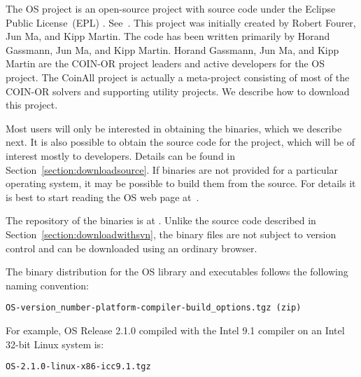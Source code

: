 \label{section:obtainingbinaries}

\ifdevelop
The OS project is an open-source project  with source code under the Eclipse Public License~(EPL)%
.
See~{\tt\UrlEpl}.  This project was initially created by Robert Fourer, Jun Ma, and Kipp Martin.
The code has been written primarily by  Horand Gassmann,   Jun Ma,  and Kipp Martin.    
Horand Gassmann,  Jun Ma,  and Kipp Martin are the COIN-OR project leaders and active developers for the OS project.
\else
The CoinAll project is actually a meta-project consisting of most of the COIN-OR solvers and supporting utility projects.  We describe how to download this project. 
\fi

Most users will only be interested in obtaining the binaries, which we describe  next.
It is also possible to obtain the source code for the project, which will be of interest mostly to developers. 
\ifdevelop
Details can be found in  Section~\ref{section:downloadsource}.
\else
If binaries are not provided for a particular operating system, it may be possible to build them from the source.
For details it is best to start reading the OS web page at~{\tt\UrlOsWiki}.
\fi



The repository of the binaries is at {\tt\UrlOsBinaries}.
%
\ifdevelop
 Unlike the source code described in Section~\ref{section:downloadwithsvn}, the binary files 
are not subject to version control and can be downloaded using an ordinary browser. 
\fi

The binary distribution for the OS library and executables follows the following naming convention:


\begin{verbatim}
OS-version_number-platform-compiler-build_options.tgz (zip)
\end{verbatim}
For example, OS  Release 2.1.0 compiled with the Intel 9.1 compiler on an Intel 32-bit Linux system is:
\begin{verbatim}
OS-2.1.0-linux-x86-icc9.1.tgz
\end{verbatim}

